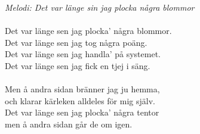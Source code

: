 {\footnotesize\textit{Melodi: Det var länge sin jag plocka några blommor}}\\
\\
Det var länge sen jag plocka' några blommor.\\
Det var länge sen jag tog några poäng.\\
Det var länge sen jag handla' på systemet.\\
Det var länge sen jag fick en tjej i säng.\\
\\
Men å andra sidan bränner jag ju hemma,\\
och klarar kärleken alldeles för mig själv.\\
Det var länge sen jag plocka' några tentor\\
men å andra sidan går de om igen.

